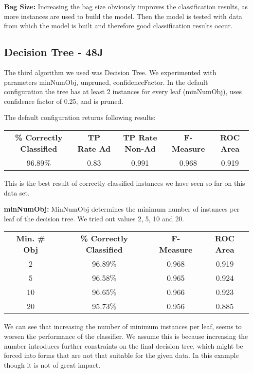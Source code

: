 \documentclass{sig-alternate-05-2015}
\begin{document}
{\textbf{Bag Size:}
Increasing the bag size obviously improves the classification results, as more instances are used to build the model. Then the model is tested with data from which the model is built and therefore good classification results occur.

\subsection{Decision Tree - 48J}
The third algorithm we used was Decision Tree. We experimented with parameters minNumObj, unpruned, confidenceFactor. In the default configuration the tree has at least 2 instances for every leaf (minNumObj), uses confidence factor of 0.25, and is pruned.

The default configuration returns following results:

\begin{center}
\begin{tabular}{c | c | c | c | c}
\textbf{\% Correctly Classified} & \textbf{TP Rate Ad} & \textbf{TP Rate Non-Ad} & \textbf{F-Measure} & \textbf{ROC Area}\\
96.89\% & 0.83 & 0.991  & 0.968 & 0.919\\
\end{tabular}
\end{center}

This is the best result of correctly classified instances we have seen so far on this data set.

\textbf{minNumObj:}
MinNumObj determines the minimum number of instances per leaf of the decision tree. We tried out values 2, 5, 10 and 20.

\begin{center}
\begin{tabular}{ c | c | c | c}
\textbf{Min. \# Obj} & \textbf{\% Correctly Classified} & \textbf{F-Measure} & \textbf{ROC Area}\\
2  & 96.89\% & 0.968 & 0.919\\
5  & 96.58\% & 0.965 & 0.924\\
10 & 96.65\% & 0.966 & 0.923\\
20 & 95.73\% & 0.956 & 0.885\\
\end{tabular}
\end{center}

We can see that increasing the number of minimum instances per leaf, seems to worsen the performance of the classifier. We assume this is because increasing the number introduces further constraints on the final decision tree, which might be forced into forms that are not that suitable for the given data. In this example though it is not of great impact.

}
\end{document}
